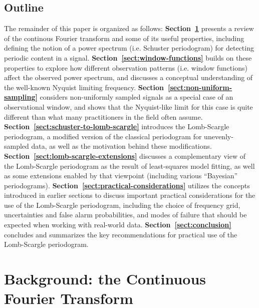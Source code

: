 \documentclass[preprint]{aastex}
\newcommand{\Sect}[1]{Section~\ref{sect:#1}}
\newcommand{\sect}[1]{\Sect{#1}}
\newcommand{\sectlabel}[1]{\label{sect:#1}}
\begin{document}
\subsection{Outline}
The remainder of this paper is organized as follows:
{\bf\sect{continuous-fourier-transform}} presents a review of the 
continous Fourier transform and some of its useful properties,
including defining the notion of a power spectrum (i.e. Schuster
periodogram) for detecting periodic content in a signal.
{\bf\sect{window-functions}} builds on these properties to explore how
different observation patterns (i.e. window functions) affect the observed
power spectrum, and discusses a conceptual understanding of the
well-known Nyquist limiting frequency.
{\bf\sect{non-uniform-sampling}} considers non-uniformly sampled signals as
a special case of an observational window, and shows that the Nyquist-like
limit for this case is quite different than what many practitioners in 
the field often assume.
{\bf\sect{schuster-to-lomb-scargle}} introduces the Lomb-Scargle periodogram,
a modified version of the classical periodogram for unevenly-sampled data,
as well as the motivation behind these modifications.
{\bf\sect{lomb-scargle-extensions}} discusses a complementary view of the
Lomb-Scargle periodogram as the result of least-squares model fitting,
as well as some extensions enabled by that viewpoint
(including various ``Bayesian'' periodograms).
{\bf\sect{practical-considerations}} utilizes the concepts introduced
in earlier sections to discuss important practical considerations for
the use of the Lomb-Scargle periodogram, including the choice of
frequency grid, uncertainties and false alarm probabilities, and modes of
failure that should be expected when working with real-world data.
{\bf\sect{conclusion}} concludes and summarizes the key recommendations
for practical use of the Lomb-Scargle periodogram.

\section{Background: the Continuous Fourier Transform}
\sectlabel{continuous-fourier-transform}
\end{document}
